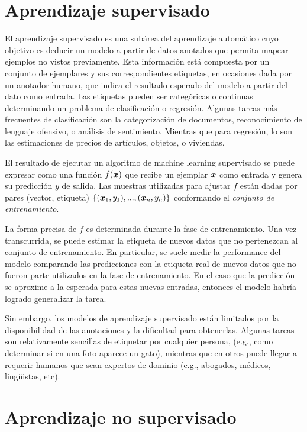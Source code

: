 \section{Aprendizaje supervisado}

El aprendizaje supervisado es una subárea del aprendizaje automático cuyo
objetivo es deducir un modelo a partir de datos anotados que permita mapear
ejemplos no vistos previamente. Esta información está compuesta por un conjunto
de ejemplares y sus correspondientes etiquetas, en ocasiones dada por un
anotador humano, que indica el resultado esperado del modelo a partir del dato
como entrada. Las etiquetas pueden ser categóricas o continuas determinando un
problema de clasificación o regresión. Algunas tareas más frecuentes de
clasificación son la categorización de documentos, reconocimiento de lenguaje
ofensivo, o análisis de sentimiento. Mientras que para regresión, lo son las
estimaciones de precios de artículos, objetos, o viviendas.

El resultado de ejecutar un algoritmo de machine learning supervisado se puede
expresar como una función $f(\boldsymbol{x})$ que recibe un ejemplar $\boldsymbol{x}$ como
entrada y genera su predicción $y$ de salida. Las muestras utilizadas para
ajustar $f$ están dadas por pares (vector, etiqueta) $\{(\boldsymbol{x}_1, y_1), ...,
(\boldsymbol{x}_n, y_n)\}$ conformando el \emph{conjunto de entrenamiento}.

La forma precisa de $f$ es determinada durante la fase de entrenamiento. Una vez
transcurrida, se puede estimar la etiqueta de nuevos datos que no pertenezcan al
conjunto de entrenamiento. En particular, se suele medir la performance del
modelo comparando las predicciones con la etiqueta real de nuevos datos que no
fueron parte utilizados en la fase de entrenamiento. En el caso que la
predicción se aproxime a la esperada para estas nuevas entradas, entonces el
modelo habría logrado generalizar la tarea.

Sin embargo, los modelos de aprendizaje supervisado están limitados por la
disponibilidad de las anotaciones y la dificultad para obtenerlas. Algunas
tareas son relativamente sencillas de etiquetar por cualquier persona, (e.g.,
como determinar si en una foto aparece un gato), mientras que en otros puede
llegar a requerir humanos que sean expertos de dominio (e.g., abogados, médicos,
lingüistas, etc).

\section{Aprendizaje no supervisado}

